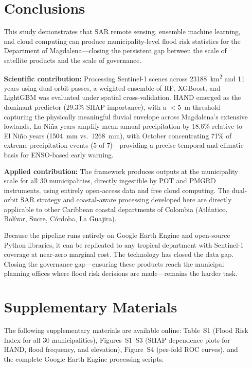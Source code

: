 \documentclass{article}
\begin{document}
\section{Conclusions}
\label{sec:conclusions}

This study demonstrates that SAR remote sensing, ensemble machine learning, and cloud computing can produce municipality-level flood risk statistics for the Department of Magdalena---closing the persistent gap between the scale of satellite products and the scale of governance.

\textbf{Scientific contribution:} Processing Sentinel-1 scenes across \SI{23188}{\kilo\metre\squared} and 11 years using dual orbit passes, a weighted ensemble of RF, XGBoost, and LightGBM was evaluated under spatial cross-validation. HAND emerged as the dominant predictor (29.3\% SHAP importance), with a $<$\SI{5}{\metre} threshold capturing the physically meaningful fluvial envelope across Magdalena's extensive lowlands. La Ni\~na years amplify mean annual precipitation by 18.6\% relative to El Ni\~no years (\SI{1504}{\milli\metre} vs.\ \SI{1268}{\milli\metre}), with October concentrating 71\% of extreme precipitation events (5 of 7)---providing a precise temporal and climatic basis for ENSO-based early warning.

\textbf{Applied contribution:} The framework produces outputs at the municipality scale for all 30 municipalities, directly ingestible by POT and PMGRD instruments, using entirely open-access data and free cloud computing. The dual-orbit SAR strategy and coastal-aware processing developed here are directly applicable to other Caribbean coastal departments of Colombia (Atl\'antico, Bol\'ivar, Sucre, C\'ordoba, La Guajira).

Because the pipeline runs entirely on Google Earth Engine and open-source Python libraries, it can be replicated to any tropical department with Sentinel-1 coverage at near-zero marginal cost. The technology has closed the data gap. Closing the governance gap---ensuring these products reach the municipal planning offices where flood risk decisions are made---remains the harder task.

\section*{Supplementary Materials}

The following supplementary materials are available online: Table~S1 (Flood Risk Index for all 30 municipalities), Figures~S1--S3 (SHAP dependence plots for HAND, flood frequency, and elevation), Figure~S4 (per-fold ROC curves), and the complete Google Earth Engine processing scripts.
\end{document}

